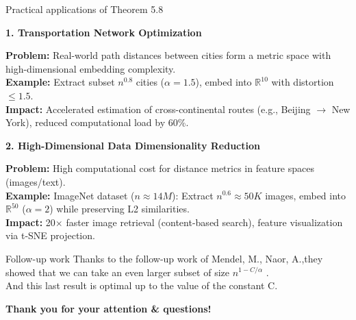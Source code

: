 \documentclass[xcolor=dvipsnames]{beamer}
\theoremstyle{remark}
\def \cbf {\color{blue}\bf}
\begin{document}
   \begin{frame}{Practical applications of Theorem 5.8}
    \vspace{-0.2cm}
    
    \textbf{\large 1. Transportation Network Optimization}  
    \vspace{0.1cm}
    
    \textbf{Problem:} Real-world path distances between cities form a metric space with high-dimensional embedding complexity.\\
    \textbf{Example:} Extract subset \( n^{0.8} \) cities (\( \alpha=1.5 \)), embed into \( \mathbb{R}^{10} \) with distortion \( \leq 1.5 \).\\
    \textbf{Impact:} Accelerated estimation of cross-continental routes (e.g., Beijing \(\to\) New York), reduced computational load by 60\%.\\
    
    \vspace{0.3cm}
    
    \textbf{\large 2. High-Dimensional Data Dimensionality Reduction}  
    \vspace{0.1cm}
    
    \textbf{Problem:} High computational cost for distance metrics in feature spaces (images/text).\\
    \textbf{Example:} ImageNet dataset (\( n \approx 14M \)): Extract \( n^{0.6} \approx 50K \) images, embed into \( \mathbb{R}^{50} \) (\( \alpha=2 \)) while preserving L2 similarities.\\
    \textbf{Impact:} 20\(\times\) faster image retrieval (content-based search), feature visualization via t-SNE projection.\\
    

  \end{frame}
  \begin{frame}{Follow-up work}
     Thanks to the follow-up work of Mendel, M., Naor, A.,they showed that we can take an even
larger subset of size \( n^{1 - C/\alpha} \) .\\ And this last result is optimal up to the value of the constant C.
  \end{frame}

  
\begin{frame}
 
    {\Large \cbf Thank you for your attention \& questions! }
   
\end{frame}
   
\end{document}
